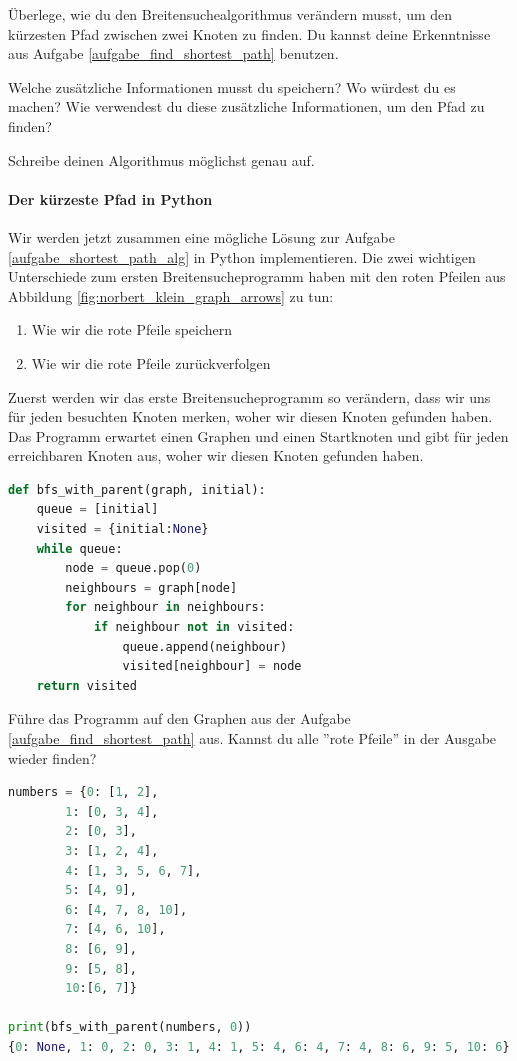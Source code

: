 \begin{aufgabe}\label{aufgabe_shortest_path_alg}
Überlege, wie du den Breitensuchealgorithmus verändern musst, um den kürzesten Pfad zwischen zwei Knoten zu finden. Du kannst deine Erkenntnisse aus Aufgabe \ref{aufgabe_find_shortest_path} benutzen.

Welche zusätzliche Informationen musst du speichern? Wo würdest du es machen?
Wie verwendest du diese zusätzliche Informationen, um den Pfad zu finden?

Schreibe deinen Algorithmus möglichst genau auf.
\end{aufgabe}



\paragraph{Der kürzeste Pfad in Python}
Wir werden jetzt zusammen eine mögliche Lösung zur Aufgabe \ref{aufgabe_shortest_path_alg} in Python implementieren. Die zwei wichtigen Unterschiede zum ersten Breitensucheprogramm haben mit den roten Pfeilen aus Abbildung \ref{fig:norbert_klein_graph_arrows} zu tun:
\begin{enumerate}
    \item Wie wir die rote Pfeile speichern
    \item Wie wir die rote Pfeile zurückverfolgen
\end{enumerate}

Zuerst werden wir das erste Breitensucheprogramm so verändern, dass wir uns für jeden besuchten Knoten merken, woher wir diesen Knoten gefunden haben. Das Programm erwartet einen Graphen und einen Startknoten und gibt für jeden erreichbaren Knoten aus, woher wir diesen Knoten gefunden haben.

\begin{lstlisting}[language=Python, caption={Programm, welches die ''rote Pfeile'' ausgehend von einem Startknoten berechnet und ausgibt. Die einzigen zwei Zeilen, die sich verändert haben, sind 3 und 10.}, label={bfs_with_parent}]
def bfs_with_parent(graph, initial):
    queue = [initial]
    visited = {initial:None}
    while queue:
        node = queue.pop(0)
        neighbours = graph[node]
        for neighbour in neighbours:
            if neighbour not in visited:
                queue.append(neighbour)
                visited[neighbour] = node
    return visited
\end{lstlisting}

Führe das Programm auf den Graphen aus der Aufgabe \ref{aufgabe_find_shortest_path} aus. Kannst du alle ''rote Pfeile'' in der Ausgabe wieder finden?
\begin{lstlisting}[language=Python]
numbers = {0: [1, 2],
        1: [0, 3, 4],
        2: [0, 3],
        3: [1, 2, 4],
        4: [1, 3, 5, 6, 7],
        5: [4, 9],
        6: [4, 7, 8, 10],
        7: [4, 6, 10],
        8: [6, 9],
        9: [5, 8],
        10:[6, 7]}

print(bfs_with_parent(numbers, 0))
{0: None, 1: 0, 2: 0, 3: 1, 4: 1, 5: 4, 6: 4, 7: 4, 8: 6, 9: 5, 10: 6}
\end{lstlisting}

